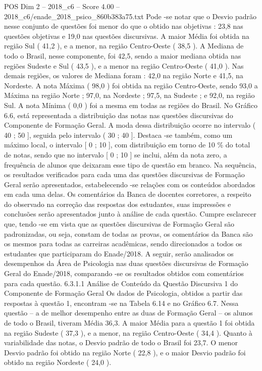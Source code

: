 \begin{textsample}{POS Dim 2 – 2018\_c6 – Score 4.00 – 2018\_c6/enade\_2018\_psico\_860b383a75.txt}
Pode -se notar que o Desvio padrão nesse conjunto de questões foi menor do que o obtido nas objetivas : 23,8 nas questões objetivas e 19,0 nas questões discursivas.
A maior Média foi obtida na região Sul ( 41,2 ), e a menor, na região Centro-Oeste ( 38,5 ).
A Mediana de todo o Brasil, nesse componente, foi 42,5, sendo a maior mediana obtida nas regiões Sudeste e Sul ( 43,5 ), e a menor na região Centro-Oeste ( 41,0 ).
Nas demais regiões, os valores de Mediana foram : 42,0 na região Norte e 41,5, na Nordeste.
A nota Máxima ( 98,0 ) foi obtida na região Centro-Oeste, sendo 93,0 a Máxima na região Norte ; 97,0, na Nordeste ; 97,5, na Sudeste ; e 92,0, na região Sul.
A nota Mínima ( 0,0 ) foi a mesma em todas as regiões do Brasil.
No Gráfico 6.6, está representada a distribuição das notas nas questões discursivas do Componente de Formação Geral.
A moda dessa distribuição ocorre no intervalo ( 40 ; 50 ], seguida pelo intervalo ( 30 ; 40 ].
Destaca -se também, como um máximo local, o intervalo [ 0 ; 10 ], com distribuição em torno de 10 \% do total de notas, sendo que no intervalo [ 0 ; 10 ] se inclui, além da nota zero, a frequência de alunos que deixaram esse tipo de questão em branco.
Na sequência, os resultados verificados para cada uma das questões discursivas de Formação Geral serão apresentados, estabelecendo -se relações com os conteúdos abordados em cada uma delas.
Os comentários da Banca de docentes corretores, a respeito do observado na correção das respostas dos estudantes, suas impressões e conclusões serão apresentados junto à análise de cada questão.
Cumpre esclarecer que, tendo -se em vista que as questões discursivas de Formação Geral são padronizadas, ou seja, constam de todas as provas, os comentários da Banca são os mesmos para todas as carreiras acadêmicas, sendo direcionados a todos os estudantes que participaram do Enade/2018.
A seguir, serão analisados os desempenhos da Área de Psicologia nas duas questões discursivas de Formação Geral do Enade/2018, comparando -se os resultados obtidos com comentários para cada questão. 6.3.1.1 Análise de Conteúdo da Questão Discursiva 1 do Componente de Formação Geral Os dados de Psicologia, obtidos a partir das respostas à questão 1, encontram -se na Tabela 6.14 e no Gráfico 6.7.
Nessa questão – a de melhor desempenho entre as duas de Formação Geral – os alunos de todo o Brasil, tiveram Média 36,3.
A maior Média para a questão 1 foi obtida na região Sudeste ( 37,3 ), e a menor, na região Centro-Oeste ( 34,4 ).
Quanto à variabilidade das notas, o Desvio padrão de todo o Brasil foi 23,7.
O menor Desvio padrão foi obtido na região Norte ( 22,8 ), e o maior Desvio padrão foi obtido na região Nordeste ( 24,0 ).

\end{textsample}
